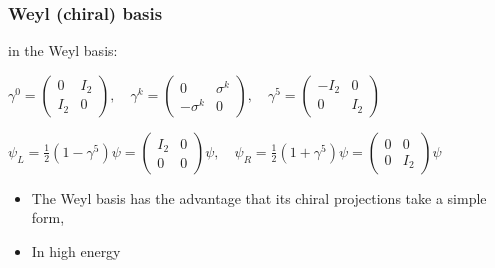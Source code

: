 \begin{frame}[t]\frametitle{ Weyl (chiral) basis }
% 

in the Weyl basis:\newline

\begin{center}
	
$\gamma ^{0}={\begin{pmatrix}0&I_{2}\\I_{2}&0\end{pmatrix}},\quad \gamma ^{k}={\begin{pmatrix}0&\sigma ^{k}\\-\sigma ^{k}&0\end{pmatrix}},\quad \gamma ^{5}={\begin{pmatrix}-I_{2}&0\\0&I_{2}\end{pmatrix}}$

\end{center}
\newline

\begin{center}
	${\displaystyle \psi _{L}={\frac {1}{2}}\left(1-\gamma ^{5}\right)\psi ={\begin{pmatrix}I_{2}&0\\0&0\end{pmatrix}}\psi ,\quad \psi _{R}={\frac {1}{2}}\left(1+\gamma ^{5}\right)\psi ={\begin{pmatrix}0&0\\0&I_{2}\end{pmatrix}}\psi }$
\end{center}


\begin{itemize}
 \item  The Weyl basis has the advantage that its chiral projections take a simple form,
 \item In high energy
\end{itemize}



\end{frame}
